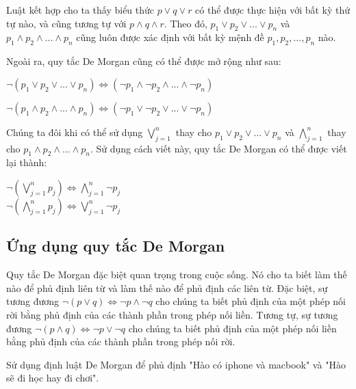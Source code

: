 \documentclass[11pt,fleqn]{book} %
\begin{document}
        Luật kết hợp cho ta thấy biểu thức $p \lor q \lor r$ có thể được thực hiện với bất kỳ thứ tự nào, và cũng tương tự với $p \land q \land r$. Theo đó, $p_1 \lor p_2 \lor ... \lor p_n$ và $p_1 \land p_2 \land ... \land p_n$ cũng luôn được xác định với bất kỳ mệnh đề $p_1, p_2, ..., p_n$ nào.
        
        Ngoài ra, quy tắc De Morgan cũng có thể được mở rộng như sau:\\
        \begin{center}
            $\neg (p_1 \lor p_2 \lor ... \lor p_n) \Leftrightarrow (\neg p_1 \land \neg p_2 \land ... \land \neg p_n)$
            
            $\neg (p_1 \land p_2 \land ... \land p_n) \Leftrightarrow (\neg p_1 \lor \neg p_2 \lor ... \lor \neg p_n)$
        \end{center}
        
        Chúng ta đôi khi có thể sử dụng $\bigvee_{j=1}^{n}$ thay cho $p_1 \lor p_2 \lor ... \lor p_n$ và $\bigwedge_{j=1}^{n}$ thay cho $p_1 \land p_2 \land ... \land p_n$. Sử dụng cách viết này, quy tắc De Morgan có thể được viết lại thành: 
        \begin{center}
            $\neg (\bigvee_{j = 1}^{n} p_j) \Leftrightarrow \bigwedge_{j=1}^{n} \neg p_j$\\
            $\neg (\bigwedge_{j = 1}^{n} p_j) \Leftrightarrow \bigvee_{j=1}^{n} \neg p_j$
        \end{center}
        
    \subsection{Ứng dụng quy tắc De Morgan}
    
        Quy tắc De Morgan đặc biệt quan trọng trong cuộc sống. Nó cho ta biết làm thế nào để phủ định liên từ và làm thế nào để phủ định các liên từ. Đặc biệt, sự tương đương $\neg (p \lor q) \Leftrightarrow \neg p \land \neg q$ cho chúng ta biết phủ định của một phép nối rời bằng phủ định của các thành phần trong phép nối liền. Tương tự, sự tương đương $\neg (p \land q) \Leftrightarrow \neg p \lor \neg q$ cho chúng ta biết phủ định của một phép nối liền bằng phủ định của các thành phần trong phép nối rời.
        
        \begin{example}
            Sử dụng định luật De Morgan để phủ định "Hào có iphone và macbook" và "Hào sẽ đi học hay đi chơi".
        \end{example}
        
\end{document}

